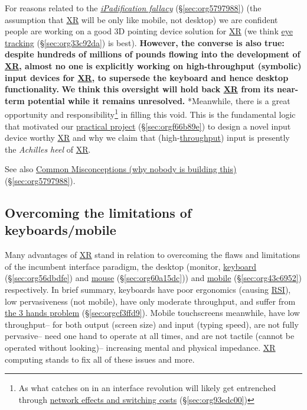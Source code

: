 \documentclass[logo,bsc,singlespacing,parskip]{infthesis}
\begin{document}
For reasons related to the \emph{\hyperref[ipadification fallacy]{iPadification fallacy}} (\S \ref{sec:org5797988}) (the assumption that \hyperref[org88b0f70]{XR} will be only like mobile, not desktop) we are confident people are working on a good 3D pointing device solution for \hyperref[org88b0f70]{XR} (we think \hyperref[sec:org33c92da]{eye tracking} (\S \ref{sec:org33c92da}) is best).
\textbf{However, the converse is also true: despite hundreds of millions of pounds flowing into the development of \hyperref[org88b0f70]{XR}, almost no one is explicitly working on high-throughput (symbolic) input devices for \hyperref[org88b0f70]{XR}, to supersede the keyboard and hence desktop functionality.}
\textbf{We think this oversight will hold back \hyperref[org88b0f70]{XR} from its near-term potential while it remains unresolved.}
*Meanwhile, there is a great opportunity and responsibility\footnote{As what catches on in an interface revolution will likely get entrenched through \hyperref[sec:org93edc00]{network effects and switching costs} (\S \ref{sec:org93edc00})} in filling this void.
This is the fundamental logic that motivated our \hyperref[sec:orgf66b89e]{practical project} (\S \ref{sec:orgf66b89e}) to design a novel input device worthy \hyperref[org88b0f70]{XR} and why we claim that (high-\hyperref[throughput]{throughput}) input is presently the \emph{Achilles heel} of \hyperref[org88b0f70]{XR}.

See also \hyperref[sec:org5797988]{Common Misconceptions (why nobody is building this)} (\S \ref{sec:org5797988}).
\subsection{Overcoming the limitations of keyboards/mobile}
\label{sec:org927c14a}
Many advantages of \hyperref[org88b0f70]{XR} stand in relation to overcoming the flaws and limitations of the incumbent interface paradigm, the desktop (monitor, \hyperref[sec:org56dbdfe]{keyboard} (\S \ref{sec:org56dbdfe}) and \hyperref[sec:org60a15dc]{mouse} (\S \ref{sec:org60a15dc})) and \hyperref[sec:org43c6952]{mobile} (\S \ref{sec:org43c6952}) respectively.
In brief summary, keyboards have poor ergonomics (causing \hyperref[org503fc2d]{RSI}), low pervasiveness (not mobile), have only moderate throughput, and suffer from \hyperref[sec:orgcf3ffd9]{the 3 hands problem} (\S \ref{sec:orgcf3ffd9}).
Mobile touchscreens meanwhile, have low throughput-- for both output (screen size) and input (typing speed), are not fully pervasive-- need one hand to operate at all times, and are not tactile (cannot be operated without looking)-- increasing mental and physical impedance.
\hyperref[org88b0f70]{XR} computing stands to fix all of these issues and more.
\end{document}
